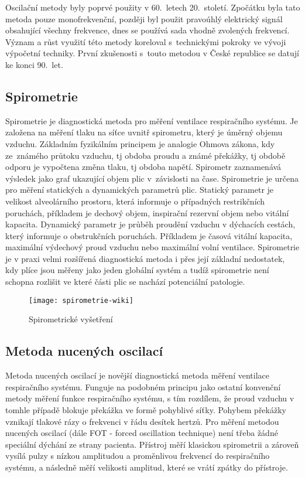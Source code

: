 Oscilační metody byly poprvé použity v 60.~letech 20.~století.  \cite{Cap2000} Zpočátku byla tato metoda pouze monofrekvenční, později byl použit pravoúhlý elektrický signál obsahující všechny frekvence, dnes se používá sada vhodně zvolených frekvencí. Význam a růst využití této metody koreloval s~technickými pokroky ve vývoji výpočetní techniky. První zkušenosti s~touto metodou v České republice se datují ke konci 90.~let. 

\subsection{Spirometrie}
Spirometrie je diagnostická metoda pro měření ventilace respiračního systému. Je založena na měření tlaku na síťce uvnitř spirometru, který je úměrný objemu vzduchu. \cite{MEFANET} Základním fyzikálním principem je analogie Ohmova zákona, kdy ze~zná\-mé\-ho průtoku vzduchu, tj obdoba proudu a známé překážky, tj obdobě odporu je vypočtena změna tlaku, tj obdoba napětí. Spirometr zaznamenává výsledek jako graf ukazující objem plic v~závislosti na čase. \cite{Medicon} Spirometrie je určena pro měření statických a dynamických parametrů plic. Statický parametr  je velikost alveolárního prostoru, která informuje o případných restrikčních poruchách, příkladem je dechový objem, inspirační rezervní objem nebo vitální kapacita. Dynamický parametr je průběh proudění vzduchu v dýchacích cestách, který informuje o obstrukčních poruchách. Příkladem je časová vitální kapacita, maximální výdechový proud vzduchu nebo maximální volní ventilace. \cite{lekfak}
Spirometrie je v praxi velmi rozšířená diagnostická metoda i přes její základní nedostatek, kdy plíce jsou měřeny jako jeden globální systém a tudíž spirometrie není schopna rozlišit ve které části plic se nachází potenciální patologie.
\begin{figure}[!ht]
			\centering
 			\texttt{[image: spirometrie-wiki]}
			\caption{Spirometrické vyšetření \cite{spirowiki}}
			 \label{vysetreni}
 \end{figure}

\subsection{Metoda nucených oscilací}
Metoda nucených oscilací je novější diagnostická metoda měření ventilace respiračního systému. Funguje na podobném principu jako ostatní konvenční metody měření funkce respiračního systému, s tím rozdílem, že proud vzduchu v tomhle případě blokuje překážka ve formě pohyblivé síťky. \cite{Busschots2022} Pohybem překážky vznikají tlakové rázy o frekvenci v řádu desítek hertzů. Pro měření metodou nucených oscilací (dále FOT - forced oscillation technique) není třeba žádné speciální dýchání ze strany pacienta. Přístroj měří klasickou spirometrii a zároveň vysílá pulzy s nízkou amplitudou a proměnlivou frekvencí do respiračního systému, a následně měří velikosti amplitud, které se vrátí zpátky do přístroje. \cite{Oostveen}

